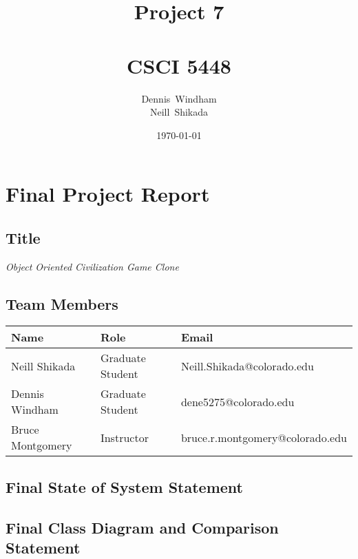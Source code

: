 \documentclass[11pt]{amsart}
\def \fnamea{Dennis}
\def \fnameb{Neill}
\def \lnamea{Windham}
\def \lnameb{Shikada}
\def \class{CSCI 5448}
\def \hwnum{7} %
\def \assgn{Project \hwnum}
\begin{document}
\author[\lnamea]{\fnamea\ \lnamea\\\fnameb\ \lnameb}
\date{\today}
\title[\assgn]{\assgn \\ \ \\\class}
\maketitle
\tableofcontents

\newpage
\section*{\textbf{Final Project Report}}
\subsection*{Title}
\begin{center}
    \textit{Object Oriented Civilization Game Clone}
\end{center}

\subsection*{Team Members} \phantom{}

\begin{table}[htbp]
    \begin{tabularx}{\textwidth}{l|l|l}
        \textbf{Name}    & \textbf{Role}    & \textbf{Email}                  \\
        \hline
        Neill Shikada    & Graduate Student & Neill.Shikada@colorado.edu
        \\
        Dennis Windham   & Graduate Student & dene5275@colorado.edu           \\
        Bruce Montgomery & Instructor       & bruce.r.montgomery@colorado.edu
    \end{tabularx}
\end{table}

\subsection*{Final State of System Statement}


\subsection*{Final Class Diagram and Comparison Statement} \phantom{}
\end{document}
